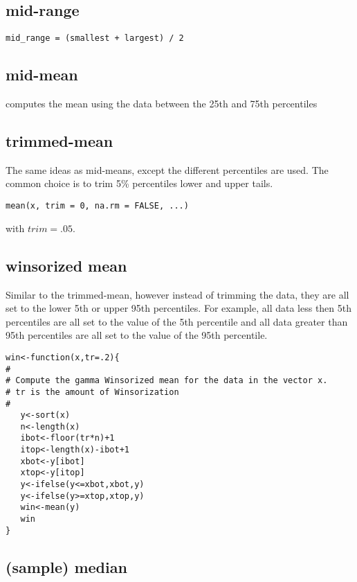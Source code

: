 \subsection{mid-range}
\label{sec:mid-range}

\begin{verbatim}
mid_range = (smallest + largest) / 2
\end{verbatim}

\subsection{mid-mean}
\label{sec:mid-mean}

computes the mean using the data between the 25th and 75th percentiles

\subsection{trimmed-mean}
\label{sec:trimmed-mean}

The same ideas as mid-means, except the different percentiles are
used. The common choice is to trim 5\% percentiles lower and upper tails.

\begin{verbatim}
mean(x, trim = 0, na.rm = FALSE, ...)
\end{verbatim}
with $trim=.05$.

\subsection{winsorized mean}
\label{sec:winsorized-mean}


Similar to the trimmed-mean, however instead of trimming the data,
they are all set to the lower 5th or upper 95th percentiles. For
example, all data less then 5th percentiles are all set to the value
of the 5th percentile and all data greater than 95th percentiles are
all set to the value of the 95th percentile.

\begin{verbatim}
win<-function(x,tr=.2){
#
# Compute the gamma Winsorized mean for the data in the vector x.
# tr is the amount of Winsorization
#
   y<-sort(x)
   n<-length(x)
   ibot<-floor(tr*n)+1
   itop<-length(x)-ibot+1
   xbot<-y[ibot]
   xtop<-y[itop]
   y<-ifelse(y<=xbot,xbot,y)
   y<-ifelse(y>=xtop,xtop,y)
   win<-mean(y)
   win
}
\end{verbatim}

\subsection{(sample) median}
\label{sec:sample-median}

